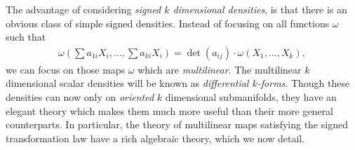 The advantage of considering \emph{signed $k$ dimensional densities}, is that there is an obvious class of simple signed densities. Instead of focusing on all functions $\omega$ such that
%
\begin{align*}
    \omega \left( \sum a_{1i} X_i, \dots, \sum a_{ki} X_i \right) = \det(a_{ij}) \cdot \omega(X_1, \dots, X_k),
\end{align*}
%
we can focus on those maps $\omega$ which are \emph{multilinear}. The multilinear $k$ dimensional scalar densities will be known as \emph{differential $k$-forms}. Though these densities can now only on \emph{oriented} $k$ dimensional submanifolds, they have an elegant theory which makes them much more useful than their more general counterparts. In particular, the theory of multilinear maps satisfying the signed transformation law have a rich algebraic theory, which we now detail.

\begin{comment}

To begin with, we would like a formula which gives the area of a $k$ dimensional parallelogram spanned by $k$ vectors $v_1, \dots, v_k$ in $\RR^n$. This quantity is
%
\[ \det \left( v_i \cdot v_j \right)^{1/2} \]
%
To see why, we note that this quantity is clearly invariant under rotation, and since we would imagine rotations to preserve rotation, we may assume $v_1, \dots, v_k$ lie in the $k$ dimensional plane in $\RR^n$ spanned by $e_1, \dots, e_k$. If $v_i = w_i \times \{ 0 \}$ for $w_i \in \RR^k$, then
%
\[ \det \left( v_i \cdot v_j \right)^{1/2} = \det \left( w_i \cdot w_j \right)^{1/2} \]
%
That this right hand side is equal to what we would expect the usual volume to be, i.e. $\det(w_1, \dots, w_k)$, is obtained by noting that if $A$ is a $k \times k$ matrix whose $i$'th column is $w_i$, then $(A^T A)_{ij} = w_j \cdot w_i$, and so
%
\begin{align*}
    \det( w_i \cdot w_j) = \det( A^T A ) = \det(A)^2 = \det(w_1, \dots, w_k)^2.
\end{align*}
%
We will refer to the matrix $( v_i \cdot v_j )$ of $k$ vectors as the Grammian, denoted $G(v_1, \dots, v_k)$. Thus the area of the parallelogram spanned by these vectors is equal to $\det(G(v_1, \dots, v_k))^{1/2}$. We note that if $A$ is the matrix with columns $v_1, \dots, v_k$, then $(A^T A)_{ij} = v_i \cdot v_j$, so $G(v_1, \dots, v_k) = A^T A$. 

If $B$ is a $k \times k$ matrix, then $AB$ is a matrix whose $i$'th column is  are now a linear combination of the vectors $v_1, \dots, v_k$. We calculate that
%
\[ G(\sum v_1, \dots, Bv_k) = (BA)^T BA = A^T B^TB A, \]
%
and so $\det(G(Bv_1,\dots,Bv_k))^{1/2} = \det(A^T B^T B A)$.

\end{comment}

